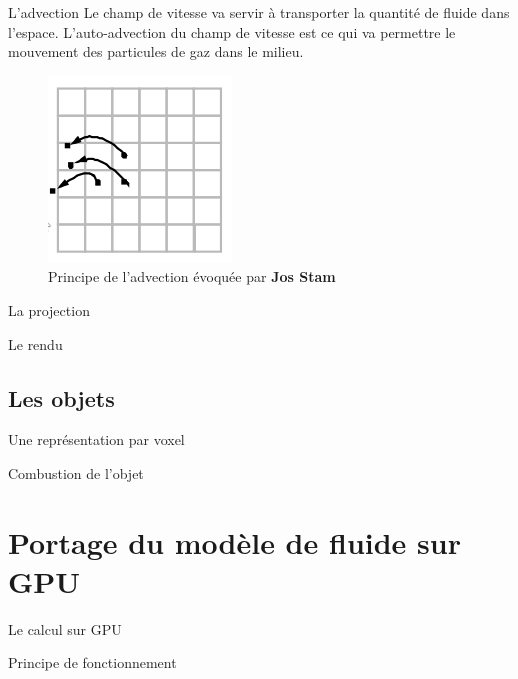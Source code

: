 \documentclass{beamer}
\begin{document}
\begin{frame}{L'advection}
  Le champ de vitesse va servir à transporter la quantité de fluide
  dans l’espace. L’auto-advection du champ de vitesse est ce qui va
  permettre le mouvement des particules de gaz dans le milieu.
  \begin{figure}[h]
    \centering\includegraphics[scale=0.6]{STAM2.png}
    \caption{Principe de l'advection évoquée par \textbf{Jos Stam}}
    \label{AdvectionStam}
  \end{figure}
\end{frame}

\begin{frame}{La projection}
\end{frame}

\begin{frame}{Le rendu}
\end{frame}

\subsection{Les objets}
\begin{frame}{Une représentation par voxel}
\end{frame}

\begin{frame}{Combustion de l'objet}
\end{frame}

\section{Portage du modèle de fluide sur GPU}
\begin{frame}{Le calcul sur GPU}
\end{frame}

\begin{frame}{Principe de fonctionnement}
\end{frame}
\end{document}
